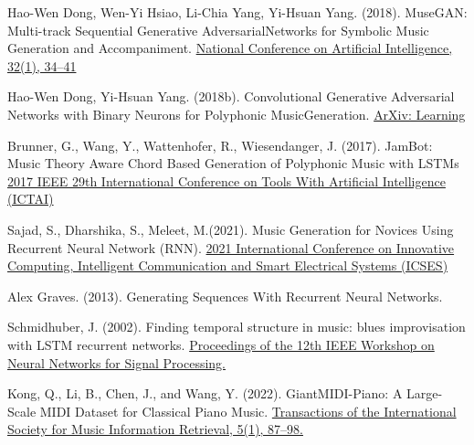 \documentclass[letterpaper]{article}
\begin{document}
\begin{thebibliography}{9}

     Hao-Wen Dong, Wen-Yi Hsiao, Li-Chia Yang, Yi-Hsuan Yang. (2018). MuseGAN: Multi-track Sequential Generative AdversarialNetworks for Symbolic Music Generation and Accompaniment.
    \href{https://dblp.uni-trier.de/db/conf/aaai/aaai2018.htmlDongHYY18}{National Conference on Artificial Intelligence, 32(1), 34–41}

     Hao-Wen Dong, Yi-Hsuan Yang. (2018b). Convolutional Generative Adversarial Networks with Binary Neurons for Polyphonic MusicGeneration.
    \href{https://arxiv.org/pdf/1804.09399}{ArXiv: Learning}

  Brunner, G., Wang, Y., Wattenhofer, R., Wiesendanger, J. (2017). JamBot: Music Theory Aware Chord Based Generation of Polyphonic Music with LSTMs
    \href{https://doi.org/10.1109/ictai.2017.00085}{2017 IEEE 29th International Conference on Tools With Artificial Intelligence (ICTAI)}
    
     Sajad, S., Dharshika, S., Meleet, M.(2021). Music Generation for Novices Using Recurrent Neural Network (RNN).
    \href{https://doi.org/10.1109/icses52305.2021.9633906}{2021 International Conference on Innovative Computing, Intelligent Communication and Smart Electrical Systems (ICSES)}
    
  
    Alex Graves. (2013). Generating Sequences With Recurrent Neural Networks.

    Schmidhuber, J. (2002). Finding temporal structure in music: blues improvisation with LSTM recurrent networks.
    \href{https://doi.org/10.1109/nnsp.2002.1030094}{ Proceedings of the 12th IEEE Workshop on Neural Networks for Signal Processing.}
    
    Kong, Q., Li, B., Chen, J., and Wang, Y. (2022). GiantMIDI-Piano: A Large-Scale MIDI Dataset for Classical Piano Music.
    \href{https://doi.org/10.5334/tismir.80}{Transactions of the International Society for Music Information Retrieval, 5(1), 87–98.}
    
\end{thebibliography}
\end{document}
